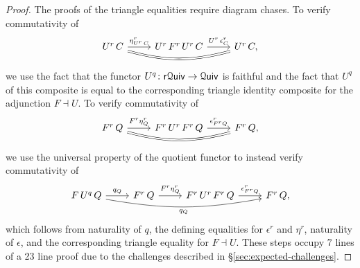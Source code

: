 \documentclass[a4paper,UKenglish,cleveref, autoref, thm-restate]{lipics-v2021}
\newcommand{\ho}{\textup{ho}}
\newcommand{\cat}[1]{\textup{\textsf{#1}}}%
\newcommand{\1}{\mathbbe{1}}
\newcommand{\2}{\mathbbe{2}}
\newcommand{\3}{\mathbbe{3}}
\newcommand{\Cat}{\mathcal{C}{\kern-.75pt}\cat{at}}
\newcommand{\Quiv}{\mathcal{Q}\cat{uiv}}
\newcommand{\rQuiv}{\cat{r}\mathcal{Q}\cat{uiv}}
\newcommand{\fixme}[1]{}
\begin{document}
\begin{proof}
The proofs of the triangle equalities require diagram chases. To verify commutativity of
\[ \begin{tikzcd} U^r\, C \arrow[r, "\eta^r_{U^r\,C}"] \arrow[rr, bend right=15, equals] & U^r\,F^r\,U^r\,C \arrow[r, "U^r\,\epsilon^r_C"] & U^r\,C, \end{tikzcd}\] we use the fact that the functor $U^q \colon \rQuiv \to \Quiv$ is faithful and the fact that $U^q$ of this composite is equal to the corresponding triangle identity composite for the adjunction $F \dashv U$. To verify commutativity of
\[ \begin{tikzcd} F^r\, Q \arrow[r, "F^r \eta^r_Q"] \arrow[rr, bend right=15, equals] & F^r\,U^r\,F^r\,Q \arrow[r, "\epsilon^r_{F^rQ}"] & F^r\, Q, \end{tikzcd}\] we use the universal property of the quotient functor to instead verify commutativity of
\[ \begin{tikzcd} F\,U^q\, Q \arrow[r, "q_Q"] \arrow[rrr, bend right=10, "q_Q"'] & F^r\, Q \arrow[r, "F^r \eta^r_Q"] & F^r\,U^r\,F^r\,Q \arrow[r, "\epsilon^r_{F^rQ}"] & F^r\, Q, \end{tikzcd}\] which follows from naturality of $q$, the defining equalities for $\epsilon^r$ and $\eta^r$, naturality of $\epsilon$, and the corresponding triangle equality for $F \dashv U$. These steps occupy 7 lines of a 23 line proof due to the challenges described in \S\ref{sec:expected-challenges}.
\end{proof}

\end{document}

